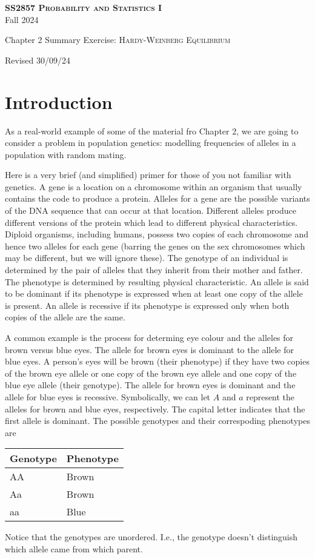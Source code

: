 \documentclass[addpoints,answers]{exam}
\begin{document}
\begin{center}
  \Large{\textsc{\textbf{SS2857 Probability and Statistics I}}}\\
  \Large{Fall 2024}

  \bigskip
  
  \large{Chapter 2 Summary Exercise: \textsc{Hardy-Weinberg Equilibrium}}

  \medskip
  
  Revised 30/09/24
\end{center}

\section*{Introduction}

As a real-world example of some of the material fro Chapter 2, we are going to consider a problem in population genetics: modelling frequencies of alleles in a population with random mating. 

Here is a very brief (and simplified) primer for those of you not familiar with genetics. A gene is a location on a chromosome within an organism that usually contains the code to produce a protein. Alleles for a gene are the possible variants of the DNA sequence that can occur at that location. Different alleles produce different versions of the protein which lead to different physical characteristics. Diploid organisms, including humans, possess two copies of each chromosome and hence two alleles for each gene (barring the genes on the sex chromosomes which may be different, but we will ignore these). The genotype of an individual is determined by the pair of alleles that they inherit from their mother and father. The phenotype is determined by resulting physical characteristic. An allele is said to be dominant if its phenotype is expressed when at least one copy of the allele is present. An allele is recessive if its phenotype is expressed only when both copies of the allele are the same.

A common example is the process for determing eye colour and the alleles for brown versus blue eyes. The allele for brown eyes is dominant to the allele for blue eyes. A person's eyes will be brown (their phenotype) if they have two copies of the brown eye allele or one copy of the brown eye allele and one copy of the blue eye allele (their genotype). The allele for brown eyes is dominant and the allele for blue eyes is recessive. Symbolically, we can let $A$ and $a$ represent the alleles for brown and blue eyes, respectively. The capital letter indicates that the first allele is dominant. The possible genotypes and their correspoding phenotypes are
\begin{center}
  \begin{tabular}{ll}
    Genotype & Phenotype\\
    \hline
    AA & Brown\\
    Aa & Brown\\
    aa & Blue
  \end{tabular}
\end{center}
Notice that the genotypes are unordered. I.e., the genotype doesn't distinguish which allele came from which parent. 
\end{document}

